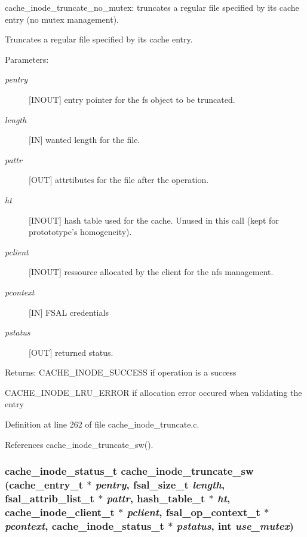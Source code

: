 cache\_\-inode\_\-truncate\_\-no\_\-mutex: truncates a regular file specified by its cache entry (no mutex management).

Truncates a regular file specified by its cache entry.

\begin{Desc}
\item[Parameters:]
\begin{description}
\item[{\em pentry}][INOUT] entry pointer for the fs object to be truncated. \item[{\em length}][IN] wanted length for the file. \item[{\em pattr}][OUT] attrtibutes for the file after the operation. \item[{\em ht}][INOUT] hash table used for the cache. Unused in this call (kept for protototype's homogeneity). \item[{\em pclient}][INOUT] ressource allocated by the client for the nfs management. \item[{\em pcontext}][IN] FSAL credentials \item[{\em pstatus}][OUT] returned status.\end{description}
\end{Desc}
\begin{Desc}
\item[Returns:]CACHE\_\-INODE\_\-SUCCESS if operation is a success \par
 

CACHE\_\-INODE\_\-LRU\_\-ERROR if allocation error occured when validating the entry \end{Desc}


Definition at line 262 of file cache\_\-inode\_\-truncate.c.

References cache\_\-inode\_\-truncate\_\-sw().
\subsubsection{\setlength{\rightskip}{0pt plus 5cm}cache\_\-inode\_\-status\_\-t cache\_\-inode\_\-truncate\_\-sw (cache\_\-entry\_\-t $\ast$ {\em pentry}, fsal\_\-size\_\-t {\em length}, fsal\_\-attrib\_\-list\_\-t $\ast$ {\em pattr}, hash\_\-table\_\-t $\ast$ {\em ht}, cache\_\-inode\_\-client\_\-t $\ast$ {\em pclient}, fsal\_\-op\_\-context\_\-t $\ast$ {\em pcontext}, cache\_\-inode\_\-status\_\-t $\ast$ {\em pstatus}, int {\em use\_\-mutex})}\label{cache__inode__truncate_8c_a0}


